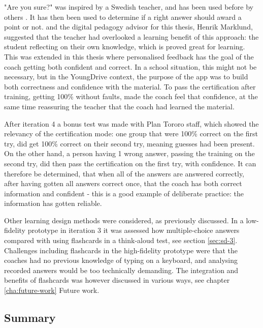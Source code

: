 
  "Are you sure?" was inspired by a Swedish teacher, and has been used before by others \citep{nicol}. It has then been used to determine if a right answer should award a point or not. \cite{nicol} and the digital pedagogy advisor for this thesis, Henrik Marklund, suggested that the teacher had overlooked a learning benefit of this approach: the student reflecting on their own knowledge, which is proved great for learning. This was extended in this thesis where personalised feedback has the goal of the coach getting both confident and correct. In a school situation, this might not be necessary, but in the YoungDrive context, the purpose of the app was to build both correctness and confidence with the material. To pass the certification after training, getting 100\% without faults, made the coach feel that confidence, at the same time reassuring the teacher that the coach had learned the material.

  After iteration 4 a bonus test was made with Plan Tororo staff, which showed the relevancy of the certification mode: one group that were 100\% correct on the first try, did get 100\% correct on their second try, meaning guesses had been present. On the other hand, a person having 1 wrong answer, passing the training on the second try, did then pass the certification on the first try, with confidence. It can therefore be determined, that when all of the answers are answered correctly, after having gotten all answers correct once, that the coach has both correct information and confident - this is a good example of deliberate practice: the information has gotten reliable.

  Other learning design methods were considered, as previously discussed. In a low-fidelity prototype in iteration 3 it was assessed how multiple-choice answers compared with using flashcards in a think-aloud test, see section \ref{sec:sd-3}. Challenges including flashcards in the high-fidelity prototype were that the coaches had no previous knowledge of typing on a keyboard, and analysing recorded answers would be too technically demanding. The integration and benefits of flashcards was however discussed in various ways, see chapter \ref{cha:future-work} Future work.

  \subsection{Summary}

